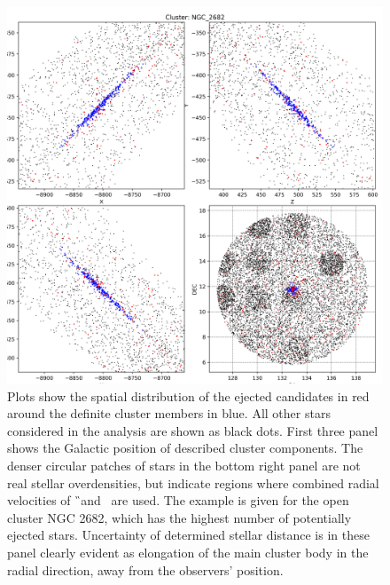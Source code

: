 \begin{figure}
	\centering
	\includegraphics[width=\textwidth]{NGC_2682_possible_ejected-step1.png}
	\caption{ Plots show the spatial distribution of the ejected candidates in red around the definite cluster members in blue. All other stars considered in the analysis are shown as black dots. First three panel shows the Galactic position of described cluster components. The denser circular patches of stars in the bottom right panel are not real stellar overdensities, but indicate regions where combined radial velocities of \G\ and \Gh\ are used. The example is given for the open cluster NGC 2682, which has the highest number of potentially ejected stars. Uncertainty of determined stellar distance is in these panel clearly evident as elongation of the main cluster body in the radial direction, away from the observers' position.}
	\label{fig:ejected_around_cluster}
\end{figure}

